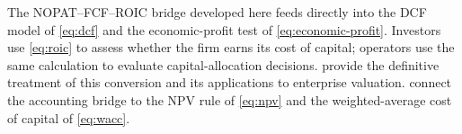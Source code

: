 The NOPAT--FCF--ROIC bridge developed here feeds directly into the DCF model of
\cref{eq:dcf} and the economic-profit test of \cref{eq:economic-profit}. Investors use
\cref{eq:roic} to assess whether the firm earns its cost of capital; operators use the same
calculation to evaluate capital-allocation decisions. \textcite{koller2025valuation} provide
the definitive treatment of this conversion and its applications to enterprise valuation.
\textcite{brealey2020} connect the accounting bridge to the NPV rule of \cref{eq:npv} and
the weighted-average cost of capital of \cref{eq:wacc}.
